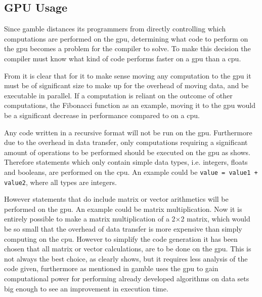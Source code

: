 \subsection*{GPU Usage}\label{GPUCode}
Since \gls{gamble} distances its programmers from directly controlling which computations are performed on the \acrshort{gpu}, determining what code to perform on the \acrshort{gpu} becomes a problem for the compiler to solve.
To make this decision the compiler must know what kind of code performs faster on a \acrshort{gpu} than a \acrshort{cpu}.

From  it is clear that for it to make sense moving any computation to the \acrshort{gpu} it must be of significant size to make up for the overhead of moving data, and be executable in parallel.
If a computation is reliant on the outcome of other computations, the Fibonacci function as an example, moving it to the \acrshort{gpu} would be a significant decrease in performance compared to on a \acrshort{cpu}.

Any code written in a recursive format will not be run on the \acrshort{gpu}. 
Furthermore due to the overhead in data transfer, only computations requiring a significant amount of operations to be performed should be executed on the \acrshort{gpu} as  shows.
Therefore statements which only contain simple data types, i.e. integers, floats and booleans, are performed on the \acrshort{cpu}.
An example could be \texttt{value = value1 + value2}, where all types are integers.

However statements that do include matrix or vector arithmetics will be performed on the \acrshort{gpu}.
An example could be matrix multiplication.
Now it is entirely possible to make a matrix multiplication of a 2$\times$2 matrix, which would be so small that the overhead of data transfer is more expensive than simply computing on the \acrshort{cpu}.
However to simplify the code generation it has been chosen that all matrix or vector calculations, are to be done on the \acrshort{gpu}.
This is not always the best choice, as  clearly shows, but it requires less analysis of the code given, furthermore as mentioned in  \gls{gamble} uses the \acrshort{gpu} to gain computational power for performing already developed algorithms on data sets big enough to see an improvement in execution time.


